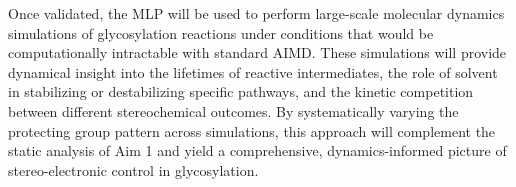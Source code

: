 \documentclass{article}
\begin{document}
Once validated, the MLP will be used to perform large-scale molecular dynamics simulations of glycosylation reactions under conditions that would be computationally intractable with standard AIMD. These simulations will provide dynamical insight into the lifetimes of reactive intermediates, the role of solvent in stabilizing or destabilizing specific pathways, and the kinetic competition between different stereochemical outcomes. By systematically varying the protecting group pattern across simulations, this approach will complement the static analysis of Aim 1 and yield a comprehensive, dynamics-informed picture of stereo-electronic control in glycosylation.

\newpage
\nocite{*}
\printbibliography
\end{document}
